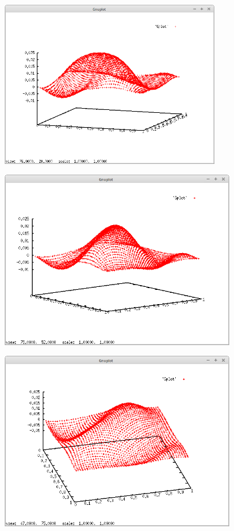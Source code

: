 \documentclass{article}
\begin{document}
	\begin{center}
		\includegraphics[width=0.70\textwidth]{pr3_1.png}
	\end{center}
		
	\begin{center}
		\includegraphics[width=0.75\textwidth]{pr3_2.png}
	\end{center}
		
	\begin{center}
		\includegraphics[width=0.75\textwidth]{pr3_3.png}
	\end{center}
\end{document}
